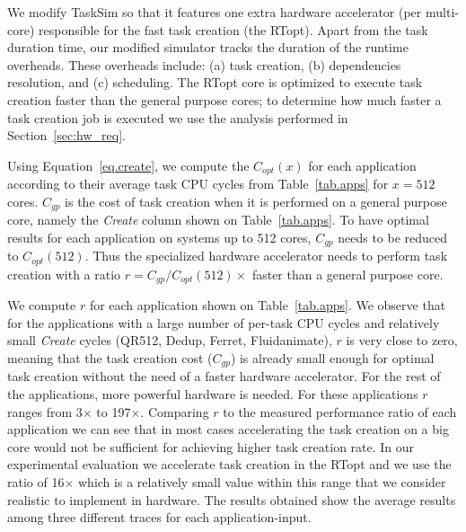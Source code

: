 We modify TaskSim so that it features one extra hardware accelerator (per multi-core) responsible for the fast task creation (the RTopt).
Apart from the task duration time, our modified simulator tracks the duration of the runtime overheads.
These overheads include: (a) task creation, (b) dependencies resolution, and (c) scheduling.
The RTopt core is optimized to execute task creation faster than the general purpose cores; 
to determine how much faster a task creation job is executed we use the analysis performed in Section~\ref{sec:hw_req}.

Using Equation~\ref{eq.create}, we compute the $C_{opt}(x)$ for each application according to their average task CPU cycles from Table~\ref{tab.apps} for $x=512$ cores.
$C_{gp}$ is the cost of task creation when it is performed on a general purpose core, namely the \textit{Create} column shown on Table~\ref{tab.apps}.
To have optimal results for each application on systems up to 512 cores, $C_{gp}$ needs to be reduced to $C_{opt}(512)$.
Thus the specialized hardware accelerator needs to perform task creation with a ratio $r = C_{gp}/C_{opt}(512) \times$ faster than a general purpose core.

We compute $r$ for each application shown on Table~\ref{tab.apps}. We observe that for the applications with a large number of per-task CPU cycles and relatively small \textit{Create} cycles (QR512, Dedup, Ferret, Fluidanimate), $r$ is very close to zero, meaning that the task creation cost ($C_{gp}$) is already small enough for optimal task creation without the need of a faster hardware accelerator.
For the rest of the applications, more powerful hardware is needed.
For these applications $r$ ranges from 3$\times$ to 197$\times$.
Comparing $r$ to the measured performance ratio of each application we can see that in most cases accelerating the task creation on a big core would not be sufficient for achieving higher task creation rate.
In our experimental evaluation we accelerate task creation in the RTopt and we use the ratio of 16$\times$ which is a relatively small value within this range that we consider realistic to implement in hardware.
The results obtained show the average results among three different traces for each application-input.
